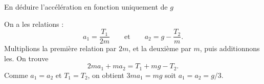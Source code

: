 \repriseEntrainement




\begin{enonce}
En déduire l'accélération en fonction uniquement de $g$
\end{enonce}


\begin{corrige}
	On a les relations : 
	\[
	a_1=\frac{T_1}{2m}
	\qquad\text{et}\qquad
	a_2=g-\frac{T_2}{m}.
	\]
	Multiplions la première relation par $2m$, et la deuxième par $m$, puis additionnons les. On trouve 
	\[
	2ma_1+ma_2=T_1+mg-T_2.
	\]
	 Comme $a_1=a_2$ et $T_1=T_2$, on obtient $3ma_1=mg$ soit $a_1=a_2=g/3$.
\end{corrige}



\finEntrainement






\afficheReponsesMelangees

\finFicheEntrainement                                                                        %




\ifdefined\mainIsLoaded\else
\printReponsesEtCorriges
\fi
